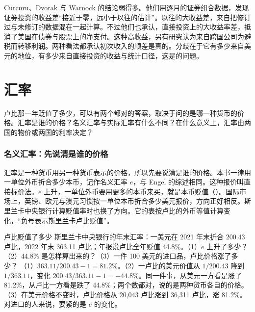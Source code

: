 Curcuru、Dvorak 与 Warnock 的结论弱得多。他们用逐月的证券组合数据，发现证券投资的收益差“接近于零，远小于以往的估计”。以往的大收益差，来自把修订过与未修订的数据混在一起计算。不过他们也承认，直接投资上的大收益率差，抵消了美国在债券与股票上的净支付。这种高收益，另有研究认为来自跨国公司为避税而转移利润\cite{curcuru2008}。两种看法都承认初次收入的顺差是真的。分歧在于它有多少来自美元的地位，有多少来自直接投资的收益与统计口径，这是的问题。


\section{汇率}\label{sec:external-rates}

卢比那一年贬值了多少，可以有两个都对的答案，取决于问的是哪一种货币的价格。汇率是谁的价格？名义汇率与实际汇率有什么不同？在什么意义上，汇率由两国的物价或两国的利率决定？

\subsubsection{名义汇率：先说清是谁的价格}
汇率是一种货币用另一种货币表示的价格，所以先要说清是谁的价格。本书一律用一单位外币折合多少本币，记作名义汇率 $e$，与 Engel 的综述相同\cite{engel2014}。这种报价叫直接标价法。$e$ 上升，一单位外币要用更多的本币来买，就是本币贬值（）。国际市场上，英镑、欧元与澳元习惯按一单位本币折合多少美元报价，方向正好相反。斯里兰卡中央银行计算贬值率时也换了方向。它的表按卢比的外币等值计算变化，“负号表示斯里兰卡卢比贬值”\cite{cbsl2023ar}。

\begin{example}{卢比贬值了多少}\label{ex:external-rupee}
斯里兰卡中央银行的年末汇率：一美元在 2021 年末折合 200.43 卢比，2022 年末 363.11 卢比；年报说卢比全年贬值 44.8\%\cite{cbsl2023ar}。（1）$e$ 上升了多少？（2）44.8\% 是怎样算出来的？（3）一件 100 美元的进口品，卢比价格涨了多少？
\solution （1）$363.11/200.43-1=81.2\%$。（2）一卢比的美元价值从 $1/200.43$ 降到 $1/363.11$，变化 $200.43/363.11-1=-44.8\%$。同一件事，从美元一方看是涨了 81.2\%，从卢比一方看是跌了 44.8\%；两个数都对，说的是两种货币各自的价格。（3）在美元价格不变时，卢比价格从 20,043 卢比涨到 36,311 卢比，涨 81.2\%。对进口的人来说，要紧的是 $e$ 的变化。
\end{example}

